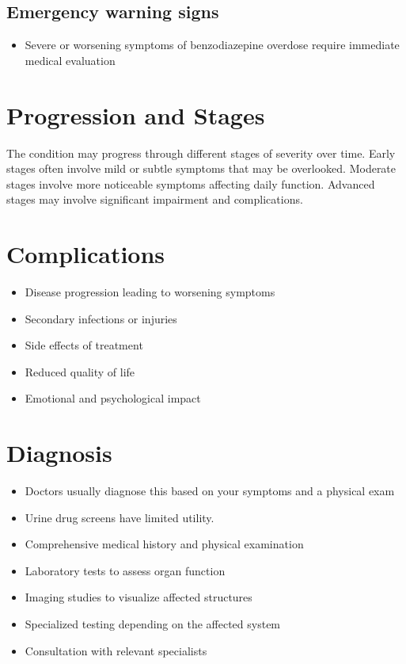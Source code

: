 \subsection{Emergency warning signs}
\begin{itemize}[noitemsep]
  \item Severe or worsening symptoms of benzodiazepine overdose require immediate medical evaluation
\end{itemize}
\section{Progression and Stages}
The condition may progress through different stages of severity over time. Early stages often involve mild or subtle symptoms that may be overlooked. Moderate stages involve more noticeable symptoms affecting daily function. Advanced stages may involve significant impairment and complications.
\section{Complications}
\begin{itemize}[noitemsep]
  \item Disease progression leading to worsening symptoms
  \item Secondary infections or injuries
  \item Side effects of treatment
  \item Reduced quality of life
  \item Emotional and psychological impact
\end{itemize}
\section{Diagnosis}
\begin{itemize}[noitemsep]
  \item Doctors usually diagnose this based on your symptoms and a physical exam
  \item Urine drug screens have limited utility.
  \item Comprehensive medical history and physical examination
  \item Laboratory tests to assess organ function
  \item Imaging studies to visualize affected structures
  \item Specialized testing depending on the affected system
  \item Consultation with relevant specialists
\end{itemize}
